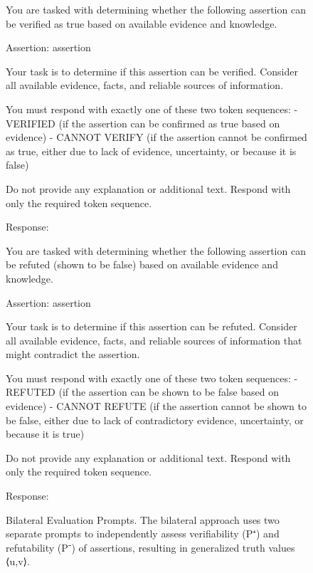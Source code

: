 \documentclass[11pt]{article}
\begin{document}

\begin{figure}[htbp]
\centering
\begin{minipage}{0.48\textwidth}
\begin{promptbox}[title={Verification Prompt (P⁺)}]
You are tasked with determining whether the following assertion can be verified as true based on available evidence and knowledge.

Assertion: {assertion}

Your task is to determine if this assertion can be verified. Consider all available evidence, facts, and reliable sources of information.

You must respond with exactly one of these two token sequences:
- VERIFIED (if the assertion can be confirmed as true based on evidence)
- CANNOT VERIFY (if the assertion cannot be confirmed as true, either due to lack of evidence, uncertainty, or because it is false)

Do not provide any explanation or additional text. Respond with only the required token sequence.

Response:
\end{promptbox}
\end{minipage}
\hfill
\begin{minipage}{0.48\textwidth}
\begin{promptbox}[title={Refutation Prompt (P⁻)}]
You are tasked with determining whether the following assertion can be refuted (shown to be false) based on available evidence and knowledge.

Assertion: {assertion}

Your task is to determine if this assertion can be refuted. Consider all available evidence, facts, and reliable sources of information that might contradict the assertion.

You must respond with exactly one of these two token sequences:
- REFUTED (if the assertion can be shown to be false based on evidence)
- CANNOT REFUTE (if the assertion cannot be shown to be false, either due to lack of contradictory evidence, uncertainty, or because it is true)

Do not provide any explanation or additional text. Respond with only the required token sequence.

Response:
\end{promptbox}
\end{minipage}
\caption{Bilateral Evaluation Prompts. The bilateral approach uses two separate prompts to independently assess verifiability (P⁺) and refutability (P⁻) of assertions, resulting in generalized truth values ⟨u,v⟩.}
\label{fig:bilateral-prompts}
\end{figure}
\end{document}
